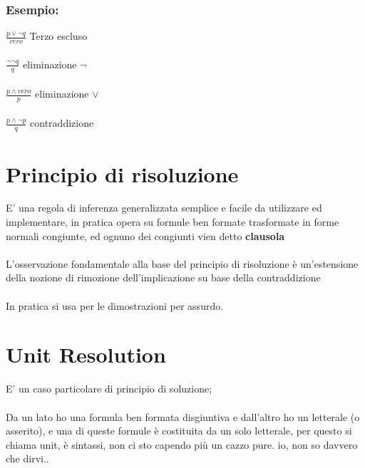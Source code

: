 \documentclass[12pt, a4paper, openany, oneside]{book}
\begin{document}
{\subsubsection{Esempio:}
$\frac{p \vee \neg q}{vero} $ Terzo escluso \\ \\
$\frac{\neg \neg q}{q} $ eliminazione $\neg$ \\ \\
$\frac{p \wedge vero}{p} $ eliminazione $\vee$ \\ \\
$\frac{p \wedge \neg p}{q} $ contraddizione
\section{Principio di risoluzione}
E' una regola di inferenza generalizzata semplice e facile da utilizzare ed 
implementare, in pratica opera su formule ben formate trasformate in forme 
normali congiunte, ed ognuno dei congiunti vien detto \textbf{clausola}
\\ \\
L'osservazione fondamentale alla base del principio di risoluzione è un'estensione 
della nozione di rimozione dell'implicazione su base della contraddizione \\ \\
In pratica si usa per le dimostrazioni per assurdo.
\section{Unit Resolution}
E' un caso particolare di principio di soluzione; \\ \\
Da un lato ho una formula ben formata disgiuntiva e dall'altro ho un letterale 
(o asserito), e una di queste formule è costituita da un solo letterale, per 
questo si chiama unit, è sintassi, non ci sto capendo più un cazzo pure. 
io, non so davvero che dirvi.. \\ \\ 
}
\end{document}
